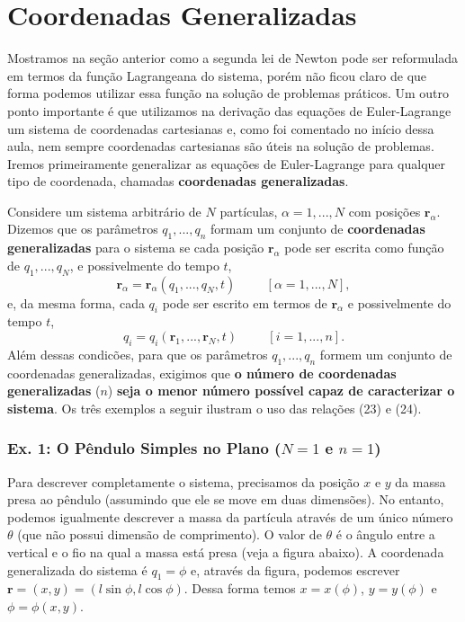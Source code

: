 \documentclass{article}
\begin{document}
\section{Coordenadas Generalizadas}

Mostramos na seção anterior como a segunda lei de Newton pode ser reformulada em termos da função Lagrangeana do sistema, porém não ficou claro de que forma podemos utilizar essa função na solução de problemas práticos. Um outro ponto importante é que utilizamos na derivação das equações de Euler-Lagrange um sistema de coordenadas cartesianas e, como foi comentado no início dessa aula, nem sempre coordenadas cartesianas são úteis na solução de problemas. Iremos primeiramente generalizar as equações de Euler-Lagrange para qualquer tipo de coordenada, chamadas \textbf{coordenadas generalizadas}.

Considere um sistema arbitrário de $N$ partículas, $\alpha = 1,...,N$ com posições $\mathbf{r}_{\alpha}$. Dizemos que os parâmetros $q_1,...,q_n$ formam um conjunto de \textbf{coordenadas generalizadas} para o sistema se cada posição $\mathbf{r}_\alpha$ pode ser escrita como função de $q_1,...,q_N$, e possivelmente do tempo $t$,
\begin{equation}
    \mathbf{r}_\alpha = \mathbf{r}_\alpha(q_1,...,q_N,t)\hspace{1cm}[\alpha = 1,...,N],
\end{equation}
e, da mesma forma, cada $q_i$ pode ser escrito em termos de $\mathbf{r}_\alpha$ e possivelmente do tempo $t$,
\begin{equation}
    q_i = q_i(\mathbf{r}_1,...,\mathbf{r}_N,t)\hspace{1cm}[i = 1,...,n].
\end{equation}
Além dessas condicões, para que os parâmetros $q_1,...,q_n$ formem um conjunto de coordenadas generalizadas, exigimos que \textbf{o número de coordenadas generalizadas} ($n$) \textbf{seja o menor número possível capaz de caracterizar o sistema}. Os três exemplos a seguir ilustram o uso das relações (23) e (24).

\subsubsection*{Ex. 1: O Pêndulo Simples no Plano ($N = 1$ e $n = 1$)}

Para descrever completamente o sistema, precisamos da posição $x$ e $y$ da massa presa ao pêndulo (assumindo que ele se move em duas dimensões). No entanto, podemos igualmente descrever a massa da partícula através de um único número $\theta$ (que não possui dimensão de comprimento). O valor de $\theta$ é o ângulo entre a vertical e o fio na qual a massa está presa (veja a figura abaixo). A coordenada generalizada do sistema é $q_1 = \phi$ e, através da figura, podemos escrever $\mathbf{r}=(x,y)  = (l\sin\phi,l\cos\phi)$. Dessa forma temos $x = x(\phi)$, $y = y(\phi)$ e $\phi = \phi(x,y)$.
\end{document}
